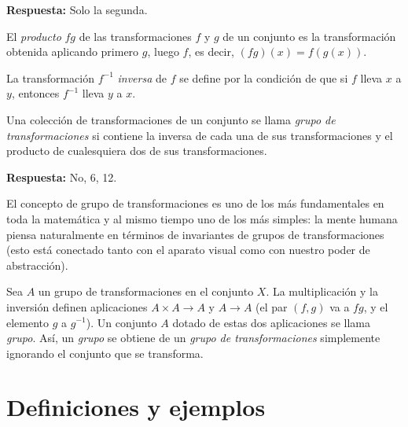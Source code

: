 
\noindent\textbf{Respuesta:} Solo la segunda.
\vspace{0.4cm}


El \textit{producto} $fg$ de las transformaciones $f$ y $g$ de un conjunto es la transformación obtenida aplicando primero $g$, luego $f$, es decir, $(fg)(x)=f(g(x))$.


La transformación $f^{-1}$ \textit{inversa} de $f$ se define por la condición de que si $f$ lleva $x$ a $y$, entonces $f^{-1}$ lleva $y$ a $x$.

Una colección de transformaciones de un conjunto se llama \textit{grupo de transformaciones} si contiene la inversa de cada una de sus transformaciones y el producto de cualesquiera dos de sus transformaciones.


\noindent\textbf{Respuesta:} No, 6, 12.

\vspace{0.4cm}

El concepto de grupo de transformaciones es uno de los más fundamentales en toda la matemática y al mismo tiempo uno de los más simples: la mente humana piensa naturalmente en términos de invariantes de grupos de transformaciones (esto está conectado tanto con el aparato visual como con nuestro poder de abstracción).

Sea $A$ un grupo de transformaciones en el conjunto $X$. La multiplicación y la inversión definen aplicaciones $A\times A\to A$ y $A\to A$ (el par $(f,g)$ va a $fg$, y el elemento $g$ a $g^{-1}$). Un conjunto $A$ dotado de estas dos aplicaciones se llama \textit{grupo}. Así, un \textit{grupo} se obtiene de un \textit{grupo de transformaciones} simplemente ignorando el conjunto que se transforma.

\clearpage
\section{Definiciones y ejemplos}

